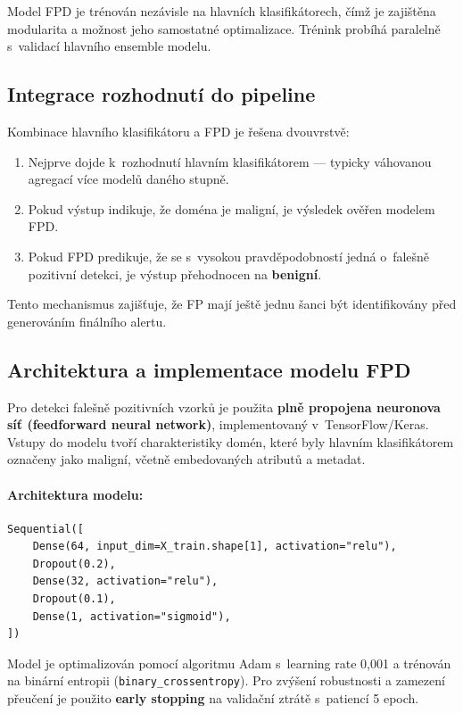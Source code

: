 Model FPD je trénován nezávisle na hlavních klasifikátorech, čímž je zajištěna modularita a možnost jeho samostatné optimalizace. Trénink probíhá paralelně s~validací hlavního ensemble modelu.

\subsection{Integrace rozhodnutí do pipeline}

Kombinace hlavního klasifikátoru a FPD je řešena dvouvrstvě:
\begin{enumerate}
    \item Nejprve dojde k~rozhodnutí hlavním klasifikátorem — typicky váhovanou agregací více modelů daného stupně.
    \item Pokud výstup indikuje, že doména je maligní, je výsledek ověřen modelem FPD.
    \item Pokud FPD predikuje, že se s~vysokou pravděpodobností jedná o~falešně pozitivní detekci, je výstup přehodnocen na \textbf{benigní}.
\end{enumerate}

Tento mechanismus zajišťuje, že FP mají ještě jednu šanci být identifikovány před generováním finálního alertu.

\subsection{Architektura a implementace modelu FPD}
\label{sec:fpd_architecture}

Pro detekci falešně pozitivních vzorků je použita \textbf{plně propojena neuronova síť (feedforward neural network)}, implementovaný v~TensorFlow/Keras. Vstupy do modelu tvoří charakteristiky domén, které byly hlavním klasifikátorem označeny jako maligní, včetně embedovaných atributů a metadat.

\paragraph{Architektura modelu:}
\begin{verbatim}
Sequential([
    Dense(64, input_dim=X_train.shape[1], activation="relu"),
    Dropout(0.2),
    Dense(32, activation="relu"),
    Dropout(0.1),
    Dense(1, activation="sigmoid"),
])
\end{verbatim}

Model je optimalizován pomocí algoritmu Adam s~learning rate 0{,}001 a trénován na binární entropii (\texttt{binary\_crossentropy}). Pro zvýšení robustnosti a zamezení přeučení je použito \textbf{early stopping} na validační ztrátě s~patiencí 5 epoch.

